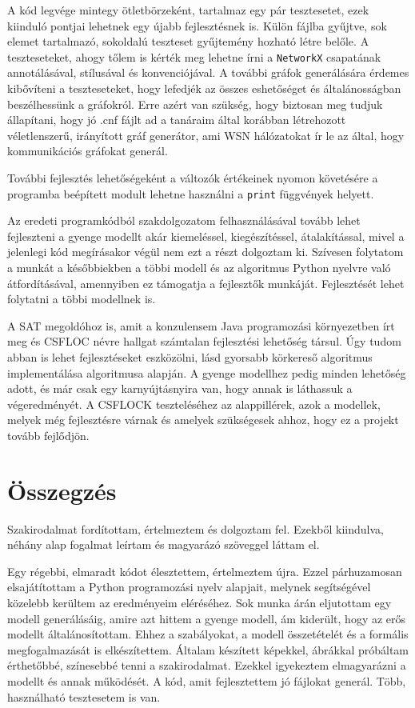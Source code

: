 \documentclass[
]{thesis-ekf}
\theoremstyle{definition}
\theoremstyle{remark}
\begin{document}
	A kód legvége mintegy ötletbörzeként, tartalmaz egy pár tesztesetet, ezek kiinduló pontjai lehetnek egy újabb fejlesztésnek is. Külön fájlba gyűjtve, sok elemet tartalmazó, sokoldalú teszteset gyűjtemény hozható létre belőle. A teszteseteket, ahogy tőlem is kérték meg lehetne írni a \texttt{NetworkX} csapatának annotálásával, stílusával és konvenciójával. A további gráfok generálására érdemes kibővíteni a teszteseteket, hogy lefedjék az összes eshetőséget és általánosságban beszélhessünk a gráfokról. Erre azért van szükség, hogy biztosan meg tudjuk állapítani, hogy jó .cnf fájlt ad a tanáraim által korábban létrehozott véletlenszerű, irányított gráf generátor, ami \textsc{WSN} hálózatokat \cite{am} ír le az által, hogy kommunikációs gráfokat generál.
	
	További fejlesztés lehetőségeként a változók értékeinek nyomon követésére a programba beépített modult lehetne használni a \texttt{print} függvények helyett.
	
	Az eredeti programkódból szakdolgozatom felhasználásával tovább lehet fejleszteni a gyenge modellt akár kiemeléssel, kiegészítéssel, átalakítással, mivel a jelenlegi kód megírásakor végül nem ezt a részt dolgoztam ki. Szívesen folytatom a munkát a későbbiekben a többi modell és az algoritmus Python nyelvre való átfordításával, amennyiben ez támogatja a fejlesztők munkáját. Fejlesztését lehet folytatni a többi modellnek is.

	A \textsc{SAT} megoldóhoz is, amit a konzulensem Java programozási környezetben írt meg és \textsc{CSFLOC} névre hallgat számtalan fejlesztési lehetőség társul. Úgy tudom abban is lehet fejlesztéseket eszközölni, lásd gyorsabb körkereső algoritmus implementálása \cite[Johnson]{johnson} algoritmusa alapján. A gyenge modellhez pedig minden lehetőség adott, és már csak egy karnyújtásnyira van, hogy annak is láthassuk a végeredményét.	A \textsc{CSFLOCK} teszteléséhez az alappillérek, azok a modellek, melyek még fejlesztésre várnak és amelyek szükségesek ahhoz, hogy ez a projekt tovább fejlődjön.
	
\chapter*{Összegzés}
	Szakirodalmat fordítottam, értelmeztem és dolgoztam fel.
	Ezekből kiindulva, néhány alap fogalmat leírtam és magyarázó szöveggel láttam el.


	Egy régebbi, elmaradt kódot élesztettem, értelmeztem újra.
	Ezzel párhuzamosan elsajátítottam a Python programozási nyelv alapjait, melynek segítségével közelebb kerültem az eredményeim eléréséhez.
	Sok munka árán eljutottam egy modell generálásáig, amire azt hittem a gyenge modell, ám kiderült, hogy az erős modellt általánosítottam.
	Ehhez a szabályokat, a modell összetételét és a formális megfogalmazását is elkészítettem.
	Általam készített képekkel, ábrákkal próbáltam érthetőbbé, színesebbé tenni a szakirodalmat.
	Ezekkel igyekeztem elmagyarázni a modellt és annak működését.
	A kód, amit fejlesztettem jó fájlokat generál. Több, használható tesztesetem is van.
	
\end{document}
